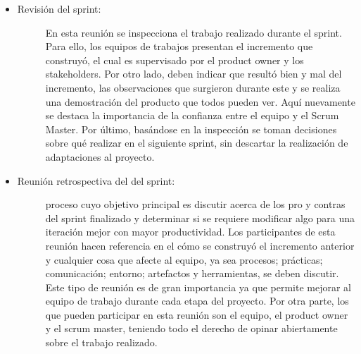 \begin{itemize}
    \item   \begin{description}
                \item[Revisión del sprint: ] En esta reunión se inspecciona el trabajo realizado durante el sprint. Para ello, los equipos de trabajos presentan el incremento que construyó, el cual es supervisado por el product owner y los stakeholders. Por otro lado, deben indicar que resultó bien y mal del incremento, las observaciones que surgieron durante este y se realiza una demostración del producto que todos pueden ver. Aquí nuevamente se destaca la importancia de la confianza entre el equipo y el Scrum Master. Por último, basándose en la inspección se toman decisiones sobre qué realizar en el siguiente sprint, sin descartar la realización de adaptaciones al proyecto. 
        
            \end{description}

    \item   \begin{description}
                \item[Reunión retrospectiva del del sprint: ] proceso cuyo objetivo principal es discutir acerca de los pro y contras del sprint finalizado y determinar si se requiere modificar algo para una iteración mejor con mayor productividad. Los participantes de esta reunión hacen referencia en el cómo se construyó el incremento anterior y cualquier cosa que afecte al equipo, ya sea procesos; prácticas; comunicación; entorno; artefactos y herramientas, se deben discutir. Este tipo de reunión es de gran importancia ya que permite mejorar al equipo de trabajo durante cada etapa del proyecto. Por otra parte, los que pueden participar en esta reunión son el equipo, el product owner y el scrum master, teniendo todo el derecho de opinar abiertamente sobre el trabajo realizado.

            \end{description}
\end{itemize}
